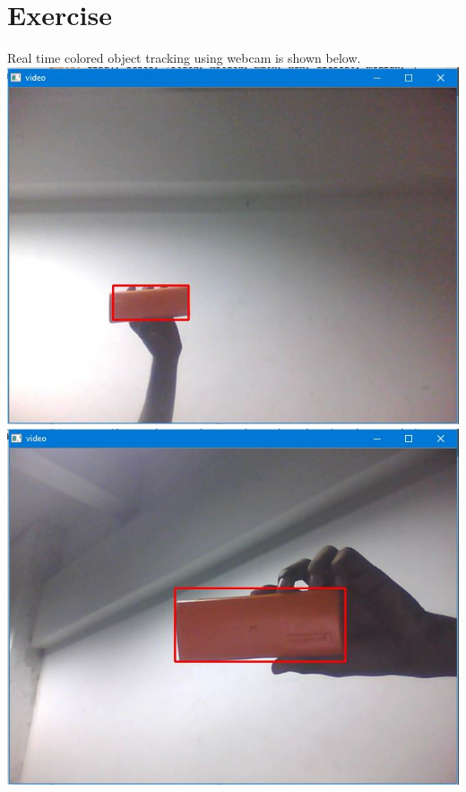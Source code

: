 \documentclass[11pt,a4paper]{article}
\begin{document}
	\section{Exercise}
	Real time colored object tracking using webcam is shown below.
	\newline
	\newline
	\includegraphics[scale=0.8]{image1.jpg}
	\newline
	\includegraphics[scale=0.8]{image2.jpg}
	
\end{document}
